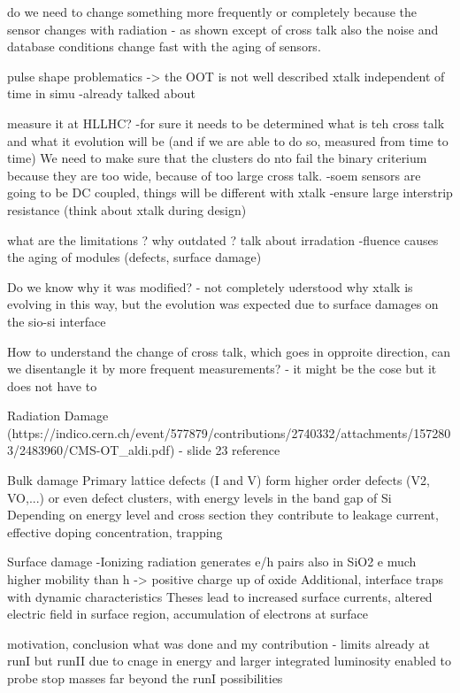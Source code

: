 do we need to change something more frequently or completely because the sensor changes with radiation
	- as shown except of cross talk also the noise and database conditions change fast with the aging of sensors.


pulse shape problematics -> the OOT is not well described
xtalk independent of time in simu
	-already talked about


measure it at HLLHC?
	-for sure it needs to be determined what is teh cross talk and what it evolution will be (and if we are able to do so, measured from time to time) We need to make sure that the clusters do nto fail the binary criterium because they are too wide, because of too large cross talk. 
	-soem sensors are going to be DC coupled, things will be different with xtalk
	-ensure large interstrip resistance (think about xtalk during design) 

what are the limitations ?
why outdated ? talk about irradation
	-fluence causes the aging of modules (defects, surface damage)

Do we know why it was modified?
	- not completely uderstood why xtalk is evolving in this way, but the evolution was expected due to surface damages on the sio-si interface

How to understand the change of cross talk, which goes in opproite direction, can we disentangle it by more frequent measurements?
	- it might be the cose but it does not have to

Radiation Damage (https://indico.cern.ch/event/577879/contributions/2740332/attachments/1572803/2483960/CMS-OT_aldi.pdf) - slide 23 reference

Bulk damage
	Primary lattice defects (I and V) form higher order defects (V2, VO,...) or even defect clusters, with energy levels in the band gap of Si
	Depending on energy level and cross section they contribute to leakage current, effective doping concentration, trapping

Surface damage
	-Ionizing radiation generates e/h pairs also in SiO2 
	e much higher mobility than h -> positive charge up of oxide
	Additional, interface traps with dynamic characteristics
	Theses lead to increased surface currents, altered electric field in surface region, accumulation of electrons at surface


motivation, conclusion
what was done and my contribution
	- limits already at runI but runII due to cnage in energy and larger integrated luminosity enabled to probe stop masses far beyond the runI possibilities

